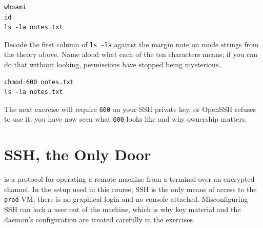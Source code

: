 \begin{verbatim}
whoami
id
ls -la notes.txt
\end{verbatim}

Decode the first column of \texttt{ls -la} against the margin note on mode strings from the theory above. Name aloud what each of the ten characters means; if you can do that without looking, permissions have stopped being mysterious.


\begin{verbatim}
chmod 600 notes.txt
ls -la notes.txt
\end{verbatim}


The next exercise will require \texttt{600} on your SSH private key, or OpenSSH refuses to use it; you have now seen what \texttt{600} looks like and why ownership matters.




\newpage
\section{SSH, the Only Door}

 is a protocol for operating a remote machine from a terminal over an encrypted channel.
In the setup used in this course, SSH is the only means of access to the \texttt{prod} VM:
there is no graphical login and no console attached.
Misconfiguring SSH can lock a user out of the machine,
which is why key material and the daemon's configuration are treated carefully in the exercises.


